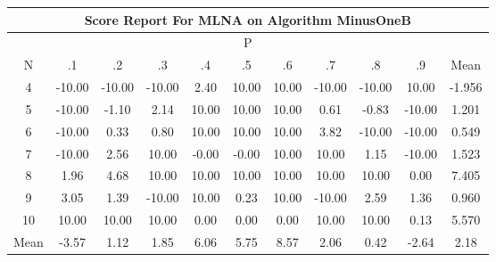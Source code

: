 \documentclass[11pt,a4paper]{report}
\begin{document}
\begin{longtable}{ | c || c | c | c | c | c | c | c | c | c || c |}
\hline
\multicolumn{11}{|c|}{ Score Report For MLNA on Algorithm MinusOneB} \\
\hline
\multicolumn{11}{|c|}{ P } \\
\hline
N & .1 & .2 & .3 & .4 & .5 & .6 & .7 & .8 & .9 & Mean\\
 \hline
 \hline
 \endhead
  4 &  \cellcolor[HTML]{FF0000} -10.00 &  \cellcolor[HTML]{FF0000} -10.00 &  \cellcolor[HTML]{FF0000} -10.00 &  \cellcolor[HTML]{BFBFFF} 2.40 &  \cellcolor[HTML]{0808FF} 10.00 &  \cellcolor[HTML]{0808FF} 10.00 &  \cellcolor[HTML]{FF0000} -10.00 &  \cellcolor[HTML]{FF0000} -10.00 &  \cellcolor[HTML]{0808FF} 10.00 & -1.956 \\
  5 &  \cellcolor[HTML]{FF0000} -10.00 &  \cellcolor[HTML]{FFE7E7} -1.10 &  \cellcolor[HTML]{C7C7FF} 2.14 &  \cellcolor[HTML]{0808FF} 10.00 &  \cellcolor[HTML]{0808FF} 10.00 &  \cellcolor[HTML]{0808FF} 10.00 &  \cellcolor[HTML]{EFEFFF} 0.61 &  \cellcolor[HTML]{FFE7E7} -0.83 &  \cellcolor[HTML]{FF0000} -10.00 & 1.201 \\
  6 &  \cellcolor[HTML]{FF0000} -10.00 &  \cellcolor[HTML]{F7F7FF} 0.33 &  \cellcolor[HTML]{E7E7FF} 0.80 &  \cellcolor[HTML]{0808FF} 10.00 &  \cellcolor[HTML]{0808FF} 10.00 &  \cellcolor[HTML]{0808FF} 10.00 &  \cellcolor[HTML]{9F9FFF} 3.82 &  \cellcolor[HTML]{FF0000} -10.00 &  \cellcolor[HTML]{FF0000} -10.00 & 0.549 \\
  7 &  \cellcolor[HTML]{FF0000} -10.00 &  \cellcolor[HTML]{BFBFFF} 2.56 &  \cellcolor[HTML]{0808FF} 10.00 &  \cellcolor[HTML]{FFFFFF} -0.00 &  \cellcolor[HTML]{FFFFFF} -0.00 &  \cellcolor[HTML]{0808FF} 10.00 &  \cellcolor[HTML]{0808FF} 10.00 &  \cellcolor[HTML]{DFDFFF} 1.15 &  \cellcolor[HTML]{FF0000} -10.00 & 1.523 \\
  8 &  \cellcolor[HTML]{CFCFFF} 1.96 &  \cellcolor[HTML]{8787FF} 4.68 &  \cellcolor[HTML]{0808FF} 10.00 &  \cellcolor[HTML]{0808FF} 10.00 &  \cellcolor[HTML]{0808FF} 10.00 &  \cellcolor[HTML]{0808FF} 10.00 &  \cellcolor[HTML]{0808FF} 10.00 &  \cellcolor[HTML]{0808FF} 10.00 &  \cellcolor[HTML]{FFFFFF} 0.00 & 7.405 \\
  9 &  \cellcolor[HTML]{AFAFFF} 3.05 &  \cellcolor[HTML]{DFDFFF} 1.39 &  \cellcolor[HTML]{FF0000} -10.00 &  \cellcolor[HTML]{0808FF} 10.00 &  \cellcolor[HTML]{F7F7FF} 0.23 &  \cellcolor[HTML]{0808FF} 10.00 &  \cellcolor[HTML]{FF0000} -10.00 &  \cellcolor[HTML]{BFBFFF} 2.59 &  \cellcolor[HTML]{DFDFFF} 1.36 & 0.960 \\
  10 &  \cellcolor[HTML]{0808FF} 10.00 &  \cellcolor[HTML]{0808FF} 10.00 &  \cellcolor[HTML]{0808FF} 10.00 &  \cellcolor[HTML]{FFFFFF} 0.00 &  \cellcolor[HTML]{FFFFFF} 0.00 &  \cellcolor[HTML]{FFFFFF} 0.00 &  \cellcolor[HTML]{0808FF} 10.00 &  \cellcolor[HTML]{0808FF} 10.00 &  \cellcolor[HTML]{FFFFFF} 0.13 & 5.570 \\
 \hline
 \hline
Mean &  \cellcolor[HTML]{FFA7A7} -3.57 &  \cellcolor[HTML]{DFDFFF} 1.12 &  \cellcolor[HTML]{CFCFFF} 1.85 &  \cellcolor[HTML]{6868FF} 6.06 &  \cellcolor[HTML]{7070FF} 5.75 &  \cellcolor[HTML]{2828FF} 8.57 &  \cellcolor[HTML]{CFCFFF} 2.06 &  \cellcolor[HTML]{F7F7FF} 0.42 &  \cellcolor[HTML]{FFBFBF} -2.64 &  \cellcolor[HTML]{C7C7FF} 2.18
\end{longtable}
\end{document}

